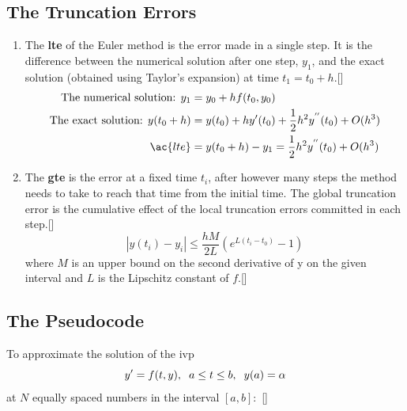 \documentclass[12pt,oneside]{book}
\begin{document}
\begin{spacing}{1.2}
			\subsection*{The Truncation Errors}
				\begin{enumerate}
					\item The \textbf{\ac{lte}} of the Euler method is the error made in a single step. It is the difference between the numerical solution after one step, $y_{1}$, and the exact solution (obtained using Taylor's expansion) at time $t_{1} = t_{0} + h$.[]
					\begin{equation*}
						\begin{split}
							\text{The numerical solution: } y_{1} & = y_{0} + hf(t_{0}, y_{0}) \\
							\text{The exact solution: } y(t_{0} + h) & = y(t_{0}) + hy'(t_{0}) + \frac{1}{2}h^2y^{''}(t_{0}) + O(h^{3}) \\
							\ac{lte} & = y(t_{0} + h) - y_{1} = \frac{1}{2}h^2y^{''}(t_{0}) + O(h^{3})
						\end{split}
					\end{equation*}
					
					\item The \textbf{\ac{gte}} is the error at a fixed time $t_{i}$, after however many steps the method needs to take to reach that time from the initial time. The global truncation error is the cumulative effect of the local truncation errors committed in each step.[]
					\begin{equation*}
						|y(t_{i}) - y_{i}| \leq \frac{hM}{2L} (e^{L(t_{i} - t_{0})} - 1)
					\end{equation*}
					where $ M $ is an upper bound on the second derivative of y on the given interval and $ L $ is the Lipschitz constant of $ f $.[]
				\end{enumerate}
			
			\subsection*{The Pseudocode}
				To approximate the solution of the \ac{ivp}
				\[ y' = f(t,y), \hspace*{0.2cm} a \leq t \leq b, \hspace*{0.2cm} y(a) = \alpha \]
				at $ N $ equally spaced numbers in the interval $ [a, b]: $ []
				

\end{spacing}
\end{document}
